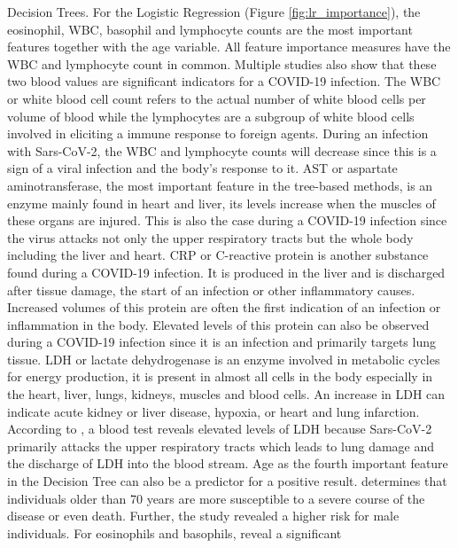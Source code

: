 Decision Trees. For the Logistic Regression (Figure \ref{fig:lr_importance}), 
the eosinophil, WBC, basophil and lymphocyte counts are the most important 
features together with the age variable. All feature importance measures have 
the WBC and lymphocyte count in common. Multiple studies also show that these 
two blood values are significant indicators for a COVID-19 infection. The WBC 
or white blood cell count refers to the actual number of white blood cells per 
volume of blood while the lymphocytes are a subgroup of white blood cells 
involved in eliciting a immune response to foreign agents.\cite{RN137, RN188} 
During an infection with Sars-CoV-2, the WBC and lymphocyte counts will 
decrease since this is a sign of a viral infection and the body's response to 
it.\cite{RN162,RN186, RN185}
AST or aspartate aminotransferase, the most important feature in the tree-based 
methods, is an enzyme mainly found in heart and liver, its levels increase when 
the muscles of these organs are injured.\cite{RN189, RN188} This is also the 
case during a COVID-19 infection since the virus attacks not only the upper 
respiratory tracts but the whole body including the liver and 
heart.\cite{RN182} CRP or C-reactive protein is another substance found during 
a COVID-19 infection. It is produced in the liver and is discharged after 
tissue damage, the start of an infection or other inflammatory causes. 
Increased volumes of this protein are often the first indication of an 
infection or inflammation in the body.\cite{RN138, RN188} Elevated levels of 
this protein can also be observed during a COVID-19 infection since it is an 
infection and primarily targets lung tissue.\cite{RN187, RN162} LDH or lactate 
dehydrogenase is an enzyme involved in metabolic cycles for energy production, 
it is present in almost all cells in the body especially in the heart, 
liver, lungs, kidneys, muscles and blood cells. An increase in LDH can indicate 
acute kidney or liver disease, hypoxia, or heart and lung 
infarction.\cite{RN190, RN188} According to \cite{RN162, RN187}, a blood test 
reveals elevated levels of LDH because Sars-CoV-2 primarily attacks the upper 
respiratory tracts which leads to lung damage and the discharge of LDH into the 
blood stream. Age as the fourth important feature in the Decision Tree can also 
be a predictor for a positive result. \cite{RN193} determines that individuals 
older than 70 years are more susceptible to a severe course of the disease or 
even death. Further, the study revealed a higher risk for male individuals.
For eosinophils and basophils, \cite{RN162, RN185} reveal a significant 
